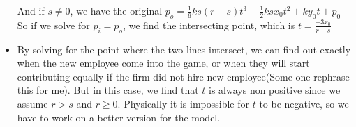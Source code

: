 \documentclass{article}
\newenvironment{atomize}
    {\begin{list} {} {
            \setlength\itemindent{0pt}
            \setlength\leftmargin{10pt}
            \setlength\labelwidth{0pt}
    }}
    {\end{list}}
\begin{document}
\begin{atomize}
\begin{itemize}
								And if $s\neq0$, we have the original $p_{o} =
								\frac{1}{6}ks(r-s)t^{3} + \frac{1}{2}ksx_{0}t^{2} + ky_{0}t +
								p_{0}$ So if we solve for $p_{i}=p_{o}$, we	find the
								intersecting point, which is $t=\frac{-3x_{0}}{r-s}$

								\item By solving for the point where the two lines intersect, we
								can find out exactly when the new employee come into the game,
								or when they will start contributing equally if the firm did not
								hire new employee(Some one rephrase this for me). But in this
								case, we find that $t$ is always non positive since we assume
								$r>s$ and $r\geq0$. Physically it is impossible for $t$ to be
								negative, so we have to work on a better version for the model.
            \end{itemize}
    \end{atomize}
\end{document}
